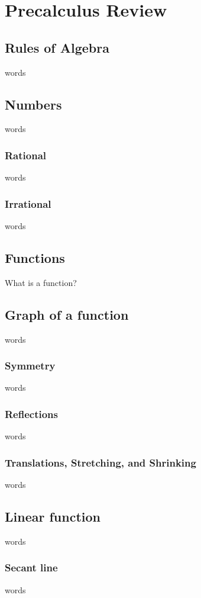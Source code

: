\chapter{Precalculus Review}

\section{Rules of Algebra}
words

\section{Numbers}
words

\subsection{Rational}
words

\subsection{Irrational}
words


\section{Functions}
What is a function?

\section{Graph of a function}
words

\subsection{Symmetry}
words

\subsection{Reflections}
words

\subsection{Translations, Stretching, and Shrinking}
words


\section{Linear function}
words

\subsection{Secant line}
words

